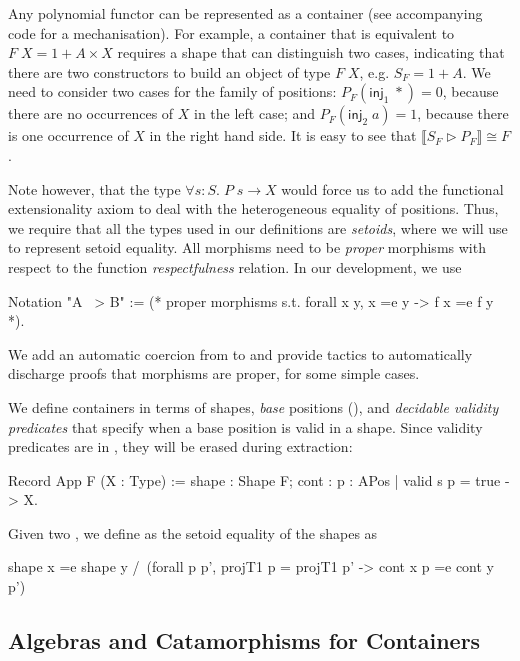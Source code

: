 \documentclass[a4paper,anonymous, UKenglish,cleveref, autoref, thm-restate]{lipics-v2021}
\begin{document}
Any polynomial functor can be represented as a container (see accompanying code
for a mechanisation).  For example, a container that is equivalent to
$F\; X = 1 + A \times X$ requires a shape that can distinguish two cases,
indicating that there are two constructors to build an object of type $F\;X$,
e.g. $S_{F} = 1 + A$. We need to consider two cases for the family of positions:
$P_{F}(\mathsf{inj}_{1}\;*) = 0$, because there are no occurrences of $X$ in the
left case; and $P_{F}(\mathsf{inj}_{2}\;a) = 1$, because there is one occurrence
of $X$ in the right hand side. It is easy to see that
$\llbracket S_{F} \triangleright P_{F} \rrbracket \cong F$.

Note however, that the type $\forall s : S.\; P\;s \to X$ would force us to add
the functional extensionality axiom to deal with the heterogeneous equality of
positions. Thus, we require that all the types used in our definitions are
\emph{setoids}, where we will use  to represent setoid equality. All
morphisms need to be \emph{proper} morphisms with respect to the function
\emph{respectfulness} relation. In our development, we use
\begin{coqcode}
Notation "A ~> B" := (* proper morphisms  s.t. forall x y, x =e y -> f x =e f y *).
\end{coqcode}
We add an automatic coercion from  to  and provide
tactics to automatically discharge proofs that morphisms are proper,  for some
simple cases.

We define containers in terms of shapes, \emph{base} positions (),
and \emph{decidable validity predicates} that
specify when a base position is valid in a shape. Since validity predicates are in
, they will be erased during extraction:
\begin{coqcode}
Record App F (X : Type) := {shape : Shape F; cont : {p : APos | valid s p = true} -> X}.
\end{coqcode}

Given two , we define
 as the setoid equality of the shapes as
\begin{coqcode}
shape x =e shape y /\ (forall p p', projT1 p = projT1 p' -> cont x p =e cont y p')
\end{coqcode}


\subsection{Algebras and Catamorphisms for Containers}
\label{sec:coq-algebras}
\end{document}
